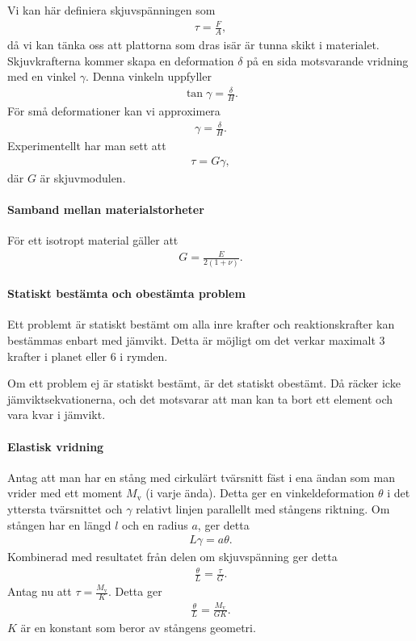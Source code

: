 Vi kan här definiera skjuvspänningen som
\begin{align*}
	\tau = \frac{F}{A},
\end{align*}
då vi kan tänka oss att plattorna som dras isär är tunna skikt i materialet. Skjuvkrafterna kommer skapa en deformation $\delta$ på en sida motsvarande vridning med en vinkel $\gamma$. Denna vinkeln uppfyller
\begin{align*}
	\tan{\gamma} = \frac{\delta}{H}.
\end{align*}
För små deformationer kan vi approximera
\begin{align*}
	\gamma = \frac{\delta}{H}.
\end{align*}
Experimentellt har man sett att
\begin{align*}
	\tau = G\gamma,
\end{align*}
där $G$ är skjuvmodulen.

\paragraph{Samband mellan materialstorheter}
För ett isotropt material gäller att
\begin{align*}
	G = \frac{E}{2(1 + \nu)}.
\end{align*}

\paragraph{Statiskt bestämta och obestämta problem}
Ett problemt är statiskt bestämt om alla inre krafter och reaktionskrafter kan bestämmas enbart med jämvikt. Detta är möjligt om det verkar maximalt $3$ krafter i planet eller $6$ i rymden.

Om ett problem ej är statiskt bestämt, är det statiskt obestämt. Då räcker icke jämviktsekvationerna, och det motsvarar att man kan ta bort ett element och vara kvar i jämvikt.

\paragraph{Elastisk vridning}
Antag att man har en stång med cirkulärt tvärsnitt fäst i ena ändan som man vrider med ett moment $M_{\text{v}}$ (i varje ända). Detta ger en vinkeldeformation $\theta$ i det yttersta tvärsnittet och $\gamma$ relativt linjen parallellt med stångens riktning. Om stången har en längd $l$ och en radius $a$, ger detta
\begin{align*}
	L\gamma = a\theta.
\end{align*}
Kombinerad med resultatet från delen om skjuvspänning ger detta
\begin{align*}
	\frac{\theta}{L} = \frac{\tau}{G}.
\end{align*}
Antag nu att $\tau = \frac{M_{\text{v}}}{K}$. Detta ger
\begin{align*}
	\frac{\theta}{L} = \frac{M_{\text{v}}}{GK}.
\end{align*}
$K$ är en konstant som beror av stångens geometri.

